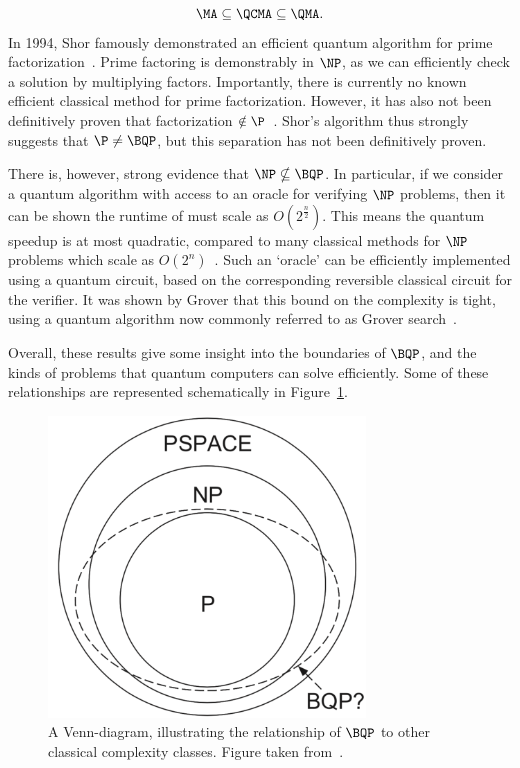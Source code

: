 \[\MA\subseteq \QCMA\subseteq \QMA.\]
In 1994, Shor famously demonstrated an efficient quantum algorithm for prime factorization~\cite{Shor1994}. Prime factoring is demonstrably in $\NP$, as we can efficiently check a solution by multiplying factors. Importantly, there is currently no known efficient classical method for prime factorization. However, it has also not been definitively proven that factorization $\notin \P$~\cite{Nielsen2000}. Shor's algorithm thus strongly suggests that $\P\neq \BQP$, but this separation has not been definitively proven.\par
There is, however, strong evidence that $\NP\nsubseteq \BQP$. In particular, if we consider a quantum algorithm with access to an oracle for verifying $\NP$ problems, then it can be shown the runtime of must scale as $O\left(2^{\frac{n}{2}}\right)$. This means the quantum speedup is at most quadratic, compared to many classical methods for $\NP$ problems which scale as $O\left(2^{n}\right)$~\cite{Bennett1997}. Such an `oracle' can be efficiently implemented using a quantum circuit, based on the corresponding reversible classical circuit for the verifier. It was shown by Grover that this bound on the complexity is tight, using a quantum algorithm now commonly referred to as Grover search~\cite{Grover1996}.
\par
Overall, these results give some insight into the boundaries of $\BQP$, and the kinds of problems that quantum computers can solve efficiently. Some of these relationships are represented schematically in Figure~\ref{fig:bqp_venn}.
\begin{figure}
\centering
\includegraphics[width=0.75\textwidth]{Figures/BQP_diagram.png}
\caption{A Venn-diagram, illustrating the relationship of $\BQP$ to other classical complexity classes. Figure taken from~\cite{Nielsen2000}.}\label{fig:bqp_venn}
\end{figure}
